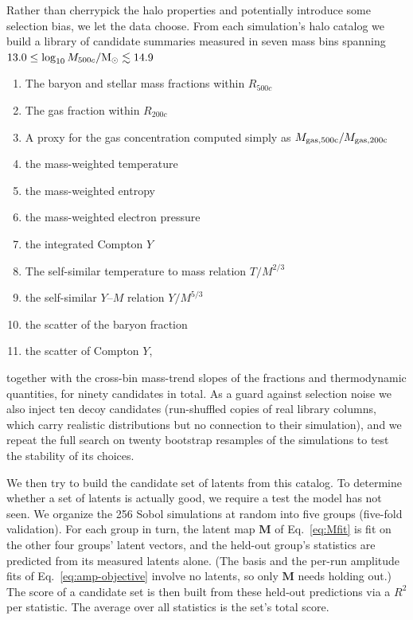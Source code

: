 \documentclass[linenumbers,trackchanges, twocolumn]{aastex701}
\begin{document}
Rather than cherrypick the halo properties and potentially introduce some selection bias, we let the data choose. From each simulation's halo catalog we build a library of candidate summaries measured in seven mass bins spanning $13.0 \le \log_{10} M_{500c}/{\rm M}_\odot \lesssim 14.9$
\begin{enumerate}
    \item The baryon and stellar mass fractions within $R_{500c}$
    \item The gas fraction within $R_{200c}$
    \item A proxy for the gas concentration computed simply as $M_{\rm gas,500c}/M_{\rm gas,200c}$
    \item the mass-weighted temperature
    \item the mass-weighted entropy
    \item the mass-weighted electron pressure
    \item the integrated Compton $Y$
    \item The self-similar temperature to mass relation $T/M^{2/3}$
    \item the self-similar $Y$--$M$ relation $Y/M^{5/3}$
    \item the scatter of the baryon fraction
    \item the scatter of Compton $Y$,
\end{enumerate}
together with the cross-bin mass-trend slopes of the fractions and thermodynamic quantities, for ninety candidates in total. As a guard against selection noise we also inject ten decoy candidates (run-shuffled copies of real library columns, which carry realistic distributions but no connection to their simulation), and we repeat the full search on twenty bootstrap resamples of the simulations to test the stability of its choices.

We then try to build the candidate set of latents from this catalog. To determine whether a set of latents is actually good, we require a test the model has not seen. We organize the 256 Sobol simulations at random into five groups (five-fold validation). For each group in turn, the latent map $\bm{M}$ of Eq.~\ref{eq:Mfit} is fit on the other four groups' latent vectors, and the held-out group's statistics are predicted from its measured latents alone. (The basis and the per-run amplitude fits of Eq.~\ref{eq:amp-objective} involve no latents, so only $\bm{M}$ needs holding out.) The score of a candidate set is then built from these held-out predictions via a $R^2$ per statistic. The average over all statistics is the set's total score.
\end{document}
